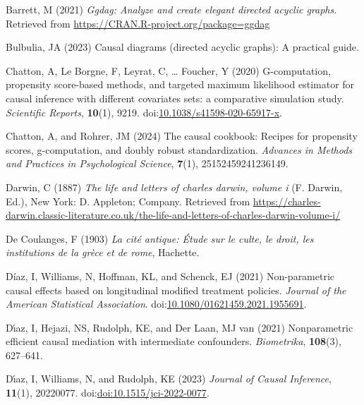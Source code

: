 \documentclass[
  single column]{article}
\newlength{\cslhangindent}
\newenvironment{CSLReferences}[2] %
 {\begin{list}{}{%
  \setlength{\itemindent}{0pt}
  \setlength{\leftmargin}{0pt}
  \setlength{\parsep}{0pt}
  \ifodd #1
   \setlength{\leftmargin}{\cslhangindent}
   \setlength{\itemindent}{-1\cslhangindent}
  \fi
  \setlength{\itemsep}{#2\baselineskip}}}
 {\end{list}}
\begin{document}
\label{refs}
\begin{CSLReferences}{1}{0}
Barrett, M (2021) \emph{Ggdag: Analyze and create elegant directed
acyclic graphs}. Retrieved from
\url{https://CRAN.R-project.org/package=ggdag}

Bulbulia, JA (2023) Causal diagrams (directed acyclic graphs): A
practical guide.

Chatton, A, Le Borgne, F, Leyrat, C, \ldots{} Foucher, Y (2020)
G-computation, propensity score-based methods, and targeted maximum
likelihood estimator for causal inference with different covariates
sets: a comparative simulation study. \emph{Scientific Reports},
\textbf{10}(1), 9219.
doi:\href{https://doi.org/10.1038/s41598-020-65917-x}{10.1038/s41598-020-65917-x}.

Chatton, A, and Rohrer, JM (2024) The causal cookbook: Recipes for
propensity scores, g-computation, and doubly robust standardization.
\emph{Advances in Methods and Practices in Psychological Science},
\textbf{7}(1), 25152459241236149.

Darwin, C (1887) \emph{The life and letters of charles darwin, volume i}
(F. Darwin, Ed.), New York: D. Appleton; Company. Retrieved from
\url{https://charles-darwin.classic-literature.co.uk/the-life-and-letters-of-charles-darwin-volume-i/}

De Coulanges, F (1903) \emph{La cité antique: Étude sur le culte, le
droit, les institutions de la grèce et de rome}, Hachette.

Díaz, I, Williams, N, Hoffman, KL, and Schenck, EJ (2021) Non-parametric
causal effects based on longitudinal modified treatment policies.
\emph{Journal of the American Statistical Association}.
doi:\href{https://doi.org/10.1080/01621459.2021.1955691}{10.1080/01621459.2021.1955691}.

Dı́az, I, Hejazi, NS, Rudolph, KE, and Der Laan, MJ van (2021)
Nonparametric efficient causal mediation with intermediate confounders.
\emph{Biometrika}, \textbf{108}(3), 627--641.

Dı́az, I, Williams, N, and Rudolph, KE (2023) \emph{Journal of Causal
Inference}, \textbf{11}(1), 20220077.
doi:\href{https://doi.org/doi:10.1515/jci-2022-0077}{doi:10.1515/jci-2022-0077}.


\end{CSLReferences}
\end{document}
